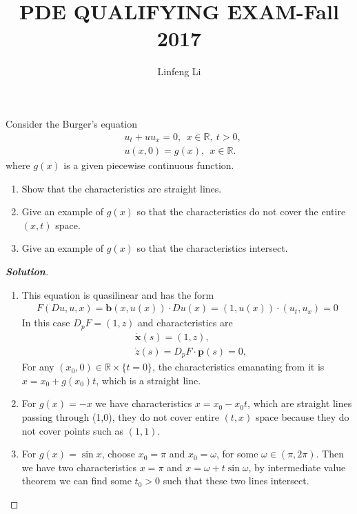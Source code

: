 \documentclass[11pt,reqno]{amsart}
\newcommand{\R}{\mathbb{R}}
\newcommand{\<}{\langle}
\renewcommand{\>}{\rangle}
\begin{document}
\title{\Large{PDE QUALIFYING EXAM-Fall 2017\\ }}
\author{Linfeng Li}
\maketitle






\begin{enumerate}[label={\arabic*.}]
\begin{tcolorbox}
\item Consider the Burger's equation
\begin{align*}
&
u_t + uu_x = 0,\ \ x\in \R,\ t>0,\\
&
u(x,0)=g(x), \ \ x\in \R.
\end{align*}
where $g(x)$ is a given piecewise continuous function.
\begin{enumerate}[leftmargin=*]
\item Show that the characteristics are straight lines.
\item Give an example of $g(x)$ so that the characteristics do not  cover the entire $(x, t)$ space.
\item Give an example of $g(x)$ so that the characteristics intersect.
\end{enumerate}
\end{tcolorbox}
\bigskip


\begin{proof}[\bf{Solution}]
\leavevmode
\begin{enumerate}
\item This equation is quasilinear and has the form
\begin{align*}
F(Du, u, x) = \mathbf{b}(x, u(x)) \cdot Du(x) = (1, u(x)) \cdot (u_t, u_x)= 0
\end{align*}
In this case $D_p F = (1, z)$ and characteristics are
\begin{align*}
& \mathbf{\dot{x}}(s) = (1, z),\\
& \dot{z}(s) = D_p F \cdot \mathbf{p}(s) = 0,
\end{align*}
For any $(x_0, 0)\in \R\times \{t=0\}$, the characteristics emanating from it is $x = x_0 + g(x_0) t$, which is a straight line.
\item For $g(x) = -x$ we have characteristics $x= x_0 -x_0 t$, which are straight lines passing through (1,0), they do not cover entire $(t,x)$ space because they do not cover points such as $(1,1)$.
\item For $g(x) = \sin x$, choose $x_0 = \pi$ and $x_0 =\omega$, for some $\omega \in (\pi, 2\pi)$. Then we have two characteristics $x= \pi$ and $x = \omega + t\sin \omega$, by intermediate value theorem we can find some $t_0>0$ such that these two lines intersect.
\end{enumerate}
\end{proof}






\end{enumerate}
\end{document}
